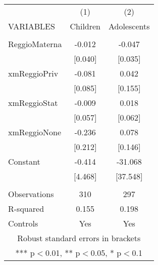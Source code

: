 \begin{tabular}{lcc} \hline
 & (1) & (2) \\
VARIABLES & Children & Adolescents \\ \hline
 &  &  \\
ReggioMaterna & -0.012 & -0.047 \\
 & [0.040] & [0.035] \\
xmReggioPriv & -0.081 & 0.042 \\
 & [0.085] & [0.155] \\
xmReggioStat & -0.009 & 0.018 \\
 & [0.057] & [0.062] \\
xmReggioNone & -0.236 & 0.078 \\
 & [0.212] & [0.146] \\
Constant & -0.414 & -31.068 \\
 & [4.468] & [37.548] \\
 &  &  \\
Observations & 310 & 297 \\
R-squared & 0.155 & 0.198 \\
 Controls & Yes & Yes \\ \hline
\multicolumn{3}{c}{ Robust standard errors in brackets} \\
\multicolumn{3}{c}{ *** p$<$0.01, ** p$<$0.05, * p$<$0.1} \\
\end{tabular}
